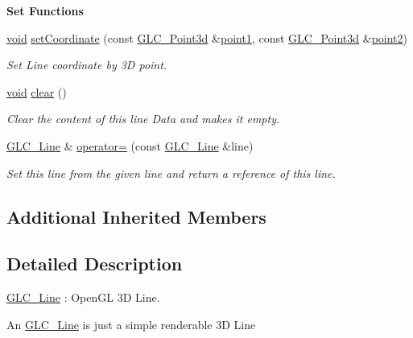 \begin{Indent}{\bf Set Functions}\par
\begin{DoxyCompactItemize}
\item 
\hyperlink{group___u_a_v_objects_plugin_ga444cf2ff3f0ecbe028adce838d373f5c}{void} \hyperlink{class_g_l_c___line_a0608ca0f9e51818c1a55ad16544eac14}{set\-Coordinate} (const \hyperlink{glc__vector3d_8h_a4e13a9bbc7ab3d34de7e98b41836772c}{G\-L\-C\-\_\-\-Point3d} \&\hyperlink{class_g_l_c___line_a67189d57edafbe5d0d773dc3d404fc80}{point1}, const \hyperlink{glc__vector3d_8h_a4e13a9bbc7ab3d34de7e98b41836772c}{G\-L\-C\-\_\-\-Point3d} \&\hyperlink{class_g_l_c___line_a93be800f2f572d37de4e140e3cc04a81}{point2})
\begin{DoxyCompactList}\small\item\em Set Line coordinate by 3\-D point. \end{DoxyCompactList}\item 
\hyperlink{group___u_a_v_objects_plugin_ga444cf2ff3f0ecbe028adce838d373f5c}{void} \hyperlink{class_g_l_c___line_aa1a35c0186322f68b6f3cef6b3f8b14c}{clear} ()
\begin{DoxyCompactList}\small\item\em Clear the content of this line Data and makes it empty. \end{DoxyCompactList}\item 
\hyperlink{class_g_l_c___line}{G\-L\-C\-\_\-\-Line} \& \hyperlink{class_g_l_c___line_a7cc1a47bb91bd78e28bf7f25dd2a3e38}{operator=} (const \hyperlink{class_g_l_c___line}{G\-L\-C\-\_\-\-Line} \&line)
\begin{DoxyCompactList}\small\item\em Set this line from the given line and return a reference of this line. \end{DoxyCompactList}\end{DoxyCompactItemize}
\end{Indent}
\subsection*{Additional Inherited Members}


\subsection{Detailed Description}
\hyperlink{class_g_l_c___line}{G\-L\-C\-\_\-\-Line} \-: Open\-G\-L 3\-D Line. 

An \hyperlink{class_g_l_c___line}{G\-L\-C\-\_\-\-Line} is just a simple renderable 3\-D Line 

